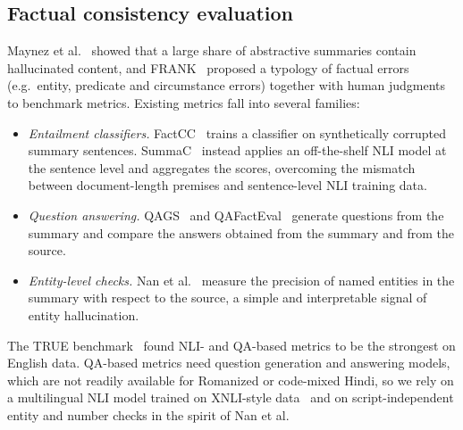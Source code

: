 \subsection{Factual consistency evaluation}
Maynez et al.~\cite{maynez2020faithfulness} showed that a large share of abstractive summaries contain hallucinated content, and FRANK~\cite{pagnoni2021frank} proposed a typology of factual errors (e.g.\ entity, predicate and circumstance errors) together with human judgments to benchmark metrics. Existing metrics fall into several families:
\begin{itemize}
  \item \emph{Entailment classifiers.} FactCC~\cite{kryscinski2020factcc} trains a classifier on synthetically corrupted summary sentences. SummaC~\cite{laban2022summac} instead applies an off-the-shelf NLI model at the sentence level and aggregates the scores, overcoming the mismatch between document-length premises and sentence-level NLI training data.
  \item \emph{Question answering.} QAGS~\cite{wang2020qags} and QAFactEval~\cite{fabbri2022qafacteval} generate questions from the summary and compare the answers obtained from the summary and from the source.
  \item \emph{Entity-level checks.} Nan et al.~\cite{nan2021entity} measure the precision of named entities in the summary with respect to the source, a simple and interpretable signal of entity hallucination.
\end{itemize}
The TRUE benchmark~\cite{honovich2022true} found NLI- and QA-based metrics to be the strongest on English data. QA-based metrics need question generation and answering models, which are not readily available for Romanized or code-mixed Hindi, so we rely on a multilingual NLI model trained on XNLI-style data~\cite{conneau2018xnli,laurer2024less} and on script-independent entity and number checks in the spirit of Nan et al.
